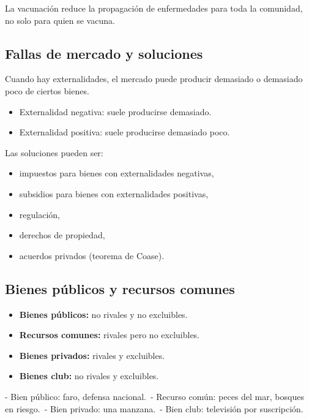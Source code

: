 \begin{ejemplo}
La vacunación reduce la propagación de enfermedades para toda la comunidad, no solo para quien se vacuna.
\end{ejemplo}

\subsection{Fallas de mercado y soluciones}

Cuando hay externalidades, el mercado puede producir demasiado o demasiado poco de ciertos bienes.

\begin{itemize}
    \item Externalidad negativa: suele producirse demasiado.
    \item Externalidad positiva: suele producirse demasiado poco.
\end{itemize}

Las soluciones pueden ser:
\begin{itemize}
    \item impuestos para bienes con externalidades negativas,
    \item subsidios para bienes con externalidades positivas,
    \item regulación,
    \item derechos de propiedad,
    \item acuerdos privados (teorema de Coase).
\end{itemize}

\subsection{Bienes públicos y recursos comunes}

\begin{itemize}
    \item \textbf{Bienes públicos:} no rivales y no excluibles.
    \item \textbf{Recursos comunes:} rivales pero no excluibles.
    \item \textbf{Bienes privados:} rivales y excluibles.
    \item \textbf{Bienes club:} no rivales y excluibles.
\end{itemize}

\begin{ejemplo}
- Bien público: faro, defensa nacional.\
- Recurso común: peces del mar, bosques en riesgo.\
- Bien privado: una manzana.\
- Bien club: televisión por suscripción.
\end{ejemplo}

